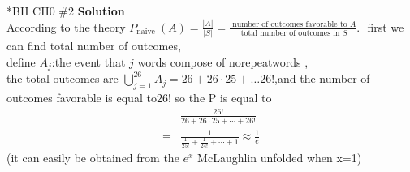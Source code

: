 \documentclass{article}
\newcommand{\solution}{\textbf{\Large Solution}}
\begin{document}
\begin{homeworkProblem}*{BH CH0 \#2}
\solution\\

According to the theory $P_{\text {naive }}(A)=\frac{|A|}{|S|}=\frac{\text { number of outcomes favorable to } A}{\text { total number of outcomes in } S} \text {. }$
	first we can find total number of outcomes,
	\\define $A_j$:the event that $j$ words compose of norepeatwords ,
	\\the total outcomes are $\bigcup_{j=1}^{26} A_j=26+26\cdot25 +\dots 26!$,and the number of outcomes favorable is equal to$26!$
	so the P is equal to
	$$
	\begin{aligned}
		&\frac{26!}{26+26\cdot25+\cdots+26!}\\
		=&\frac{1}{\frac{1}{25!}+\frac{1}{24!}+\cdots+1}\approx\frac{1}{e}
	\end{aligned} 
	$$
	(it can easily be obtained from the $e^x$ McLaughlin unfolded when x=1)


\end{homeworkProblem}
\end{document}
